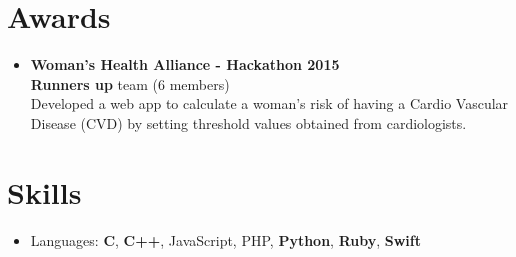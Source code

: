 \documentclass[10pt]{article}%
\begin{document}
\section*{Awards}

\begin{itemize} \setlength{\parskip}{0.5pt}

\item \textbf{Woman's Health Alliance - Hackathon 2015} \\
\textbf{Runners up} team (6 members)\\
Developed a web app to calculate a woman's risk of having a Cardio Vascular Disease (CVD) by setting threshold values obtained from cardiologists.
        
\end{itemize}

\section*{Skills}

\begin{itemize}
  \item Languages: \textbf{C}, \textbf{C++}, JavaScript, PHP, \textbf{Python}, \textbf{Ruby}, \textbf{Swift}

\end{itemize}
\end{document}
